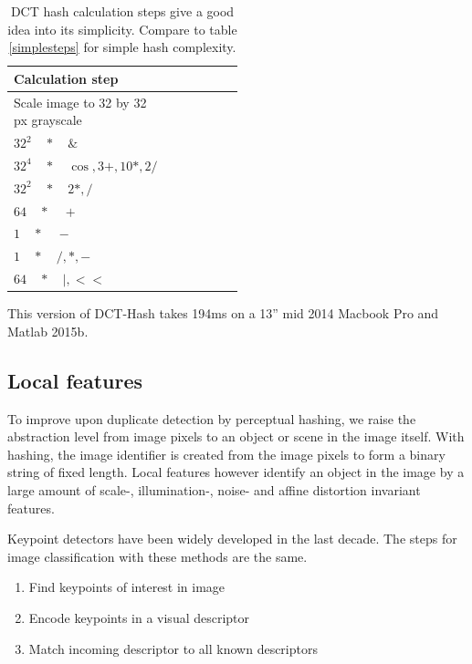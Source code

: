 \documentclass[english,12pt,a4paper,pdftex,elec,utf8]{aaltothesis}
\begin{document}
\def\arraystretch{1.5}
\begin{table}[htb]
\caption{DCT hash calculation steps give a good idea into its simplicity. Compare to table \ref{simplesteps} for simple hash complexity.}
\label{dctsteps}
\begin{center}
\begin{tabular}{lp{0.5\linewidth}}
  Calculation step\\
  \hline\hline
  Scale image to 32 by 32 px grayscale\\
  \hline
  $32^2\quad*\quad \&$ \\
  \hline
  $32^4 \quad*\quad \cos, 3+, 10*, 2/$ \\
  \hline
  $32^2\quad*\quad 2*, /$\\
  \hline
  $64 \quad*\quad +$\\
  \hline
  $1 \quad*\quad -$\\
  \hline
  $1 \quad*\quad /, *, -$\\
  \hline
  $64 \quad*\quad |, <<$\\
  \hline
\end{tabular}
\end{center}\end{table}

This version of DCT-Hash takes 194ms on a 13'' mid 2014 Macbook Pro and Matlab 2015b.

\subsection{Local features}
To improve upon duplicate detection by perceptual hashing, we raise the abstraction level from image pixels to an object or scene in the image itself. With hashing, the image identifier is created from the image pixels to form a binary string of fixed length. Local features however identify an object in the image by a large amount of scale-, illumination-, noise- and affine distortion invariant features.

Keypoint detectors have been widely developed in the last decade. The steps for image classification with these methods are the same.

\begin{enumerate}
\item Find keypoints of interest in image
\item Encode keypoints in a visual descriptor
\item Match incoming descriptor to all known descriptors
\end{enumerate}
\end{document}
